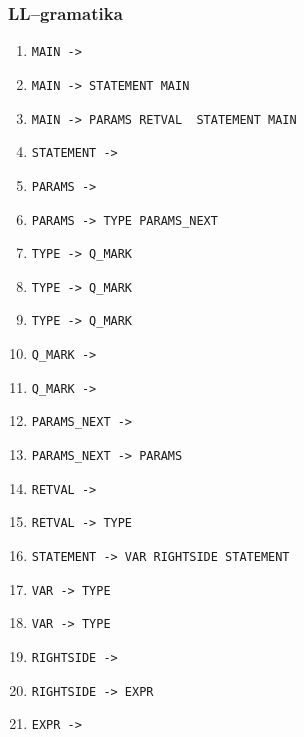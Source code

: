 \documentclass[a4paper, 12pt]{article} %
\begin{document}
            {\fontsize{10.1}{13.4}\selectfont
            \subsubsection*{LL--gramatika}\label{llgramatika}
            \begin{enumerate}[noitemsep]
                \item \texttt{MAIN -> }
                \item \texttt{MAIN -> STATEMENT MAIN}
                \item \texttt{{MAIN ->  PARAMS 
                RETVAL } STATEMENT  MAIN }
                \item \texttt{STATEMENT -> \blue{$\epsilon$}}
                \item \texttt{PARAMS -> \blue{$\epsilon$}}
                \item \texttt{PARAMS ->  TYPE PARAMS\_NEXT}
                \item \texttt{TYPE ->  Q\_MARK}
                \item \texttt{TYPE ->  Q\_MARK}
                \item \texttt{TYPE ->  Q\_MARK}
                \item \texttt{Q\_MARK -> \blue{$\epsilon$}}
                \item \texttt{Q\_MARK -> }
                \item \texttt{PARAMS\_NEXT -> \blue{$\epsilon$}}
                \item \texttt{PARAMS\_NEXT ->  PARAMS}
                \item \texttt{RETVAL -> \blue{$\epsilon$}}
                \item \texttt{RETVAL ->  TYPE}
                \item \texttt{STATEMENT -> VAR RIGHTSIDE STATEMENT}
                \item \texttt{VAR ->  TYPE}
                \item \texttt{VAR ->  TYPE}
                \item \texttt{RIGHTSIDE -> \blue{$\epsilon$}}
                \item \texttt{RIGHTSIDE ->  EXPR}
                \item \texttt{EXPR -> }

\end{enumerate}}
\end{document}
